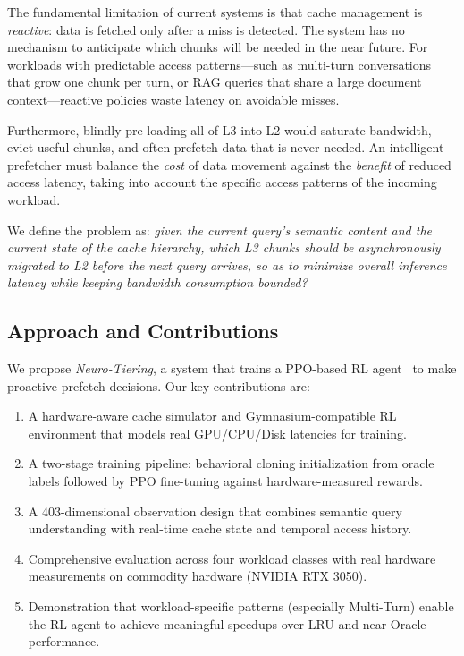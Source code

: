 \documentclass[conference]{IEEEtran}
\begin{document}
The fundamental limitation of current systems is that cache management is \emph{reactive}: data is fetched only after a miss is detected. The system has no mechanism to anticipate which chunks will be needed in the near future. For workloads with predictable access patterns—such as multi-turn conversations that grow one chunk per turn, or RAG queries that share a large document context—reactive policies waste latency on avoidable misses.

Furthermore, blindly pre-loading all of L3 into L2 would saturate bandwidth, evict useful chunks, and often prefetch data that is never needed. An intelligent prefetcher must balance the \emph{cost} of data movement against the \emph{benefit} of reduced access latency, taking into account the specific access patterns of the incoming workload.

We define the problem as: \emph{given the current query's semantic content and the current state of the cache hierarchy, which L3 chunks should be asynchronously migrated to L2 before the next query arrives, so as to minimize overall inference latency while keeping bandwidth consumption bounded?}

\subsection{Approach and Contributions}

We propose \emph{Neuro-Tiering}, a system that trains a PPO-based RL agent~\cite{schulman2017proximal} to make proactive prefetch decisions. Our key contributions are:

\begin{enumerate}
    \item A hardware-aware cache simulator and Gymnasium-compatible RL environment that models real GPU/CPU/Disk latencies for training.
    \item A two-stage training pipeline: behavioral cloning initialization from oracle labels followed by PPO fine-tuning against hardware-measured rewards.
    \item A 403-dimensional observation design that combines semantic query understanding with real-time cache state and temporal access history.
    \item Comprehensive evaluation across four workload classes with real hardware measurements on commodity hardware (NVIDIA RTX 3050).
    \item Demonstration that workload-specific patterns (especially Multi-Turn) enable the RL agent to achieve meaningful speedups over LRU and near-Oracle performance.
\end{enumerate}
\end{document}
